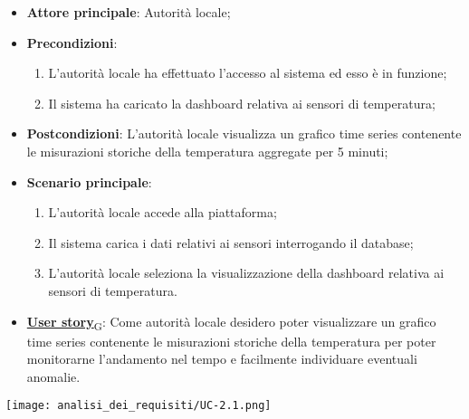 \begin{itemize}
	\item \textbf{Attore principale}: Autorità locale;
	\item \textbf{Precondizioni}:
	      \begin{enumerate}
		      \item L'autorità locale ha effettuato l'accesso al sistema ed esso è in funzione;
		      \item Il sistema ha caricato la dashboard relativa ai sensori di temperatura;
	      \end{enumerate}
	\item \textbf{Postcondizioni}: L'autorità locale visualizza un grafico time series contenente le misurazioni storiche
	      della temperatura aggregate per 5 minuti;
	\item \textbf{Scenario principale}:
	      \begin{enumerate}
		      \item L'autorità locale accede alla piattaforma;
		      \item Il sistema carica i dati relativi ai sensori interrogando il database;
		      \item L'autorità locale seleziona la visualizzazione della dashboard relativa ai sensori di temperatura.
	      \end{enumerate}
	\item \href{https://7last.github.io/docs/rtb/documentazione-interna/glossario\#user-story}{\textbf{User story}\textsubscript{G}}: Come autorità locale desidero poter visualizzare un grafico time series contenente le misurazioni storiche della temperatura
	      per poter monitorarne l'andamento nel tempo e facilmente individuare eventuali anomalie.
\end{itemize}
\begin{center}
	\texttt{[image: analisi\_dei\_requisiti/UC-2.1.png]}
\end{center}

